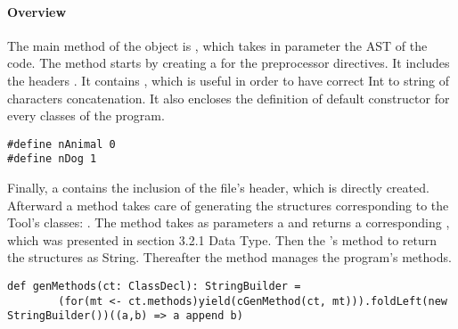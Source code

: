 \paragraph{Overview}
The main method of the object
\newline
\lstset{style=customc}{\lstinline[basicstyle=\small\ttfamily]|COutputGeneration|} is
\lstset{style=customc}{\lstinline[basicstyle=\small\ttfamily]|def run(ctx: Context)(prog: Program)|}, which takes
in parameter the AST of the code. %
\newline
The method starts by creating a \lstset{style=customc}{\lstinline[basicstyle=\small\ttfamily]|StringBuilders|} for the preprocessor directives.
It includes the headers \lstset{style=customc}{\lstinline[basicstyle=\small\ttfamily]|stdio.h, string.h and stdlib.h|}.
It contains \lstset{style=customc}{\lstinline[basicstyle=\small\ttfamily]|#define INT_MAX_LENGTH 12|}, which is useful
in order to have correct Int to string of characters concatenation.
It also encloses the definition of default constructor for every classes of the program.
\begin{lstlisting}[caption={In the case of the example used in section 2. Examples}, captionpos=b]
#define nAnimal 0
#define nDog 1
\end{lstlisting}
Finally, a \lstset{style=customc}{\lstinline[basicstyle=\small\ttfamily]|StringBuilder|} contains the inclusion of the file's header,
which is directly created.
\newline
Afterward a method takes care of generating the structures corresponding to the Tool's classes:
\newline
\lstset{style=customc}{\lstinline[basicstyle=\small\ttfamily]|def genStructDef(ct: ClassDecl): StructDef|}.
The method takes as parameters a \lstset{style=customc}{\lstinline[basicstyle=\small\ttfamily]|ClassDecl|}
and returns a corresponding \lstset{style=customc}{\lstinline[basicstyle=\small\ttfamily]|StructDef|},
which was presented in section 3.2.1 Data Type. Then the \lstset{style=customc}{\lstinline[basicstyle=\small\ttfamily]|StructDef|}'s method
\lstset{style=customc}{\lstinline[basicstyle=\small\ttfamily]|toStringRepr|} to return the structures as String.
\newline
Thereafter the method manages the program's methods.
\begin{lstlisting}
def genMethods(ct: ClassDecl): StringBuilder =
        (for(mt <- ct.methods)yield(cGenMethod(ct, mt))).foldLeft(new StringBuilder())((a,b) => a append b)
\end{lstlisting}
